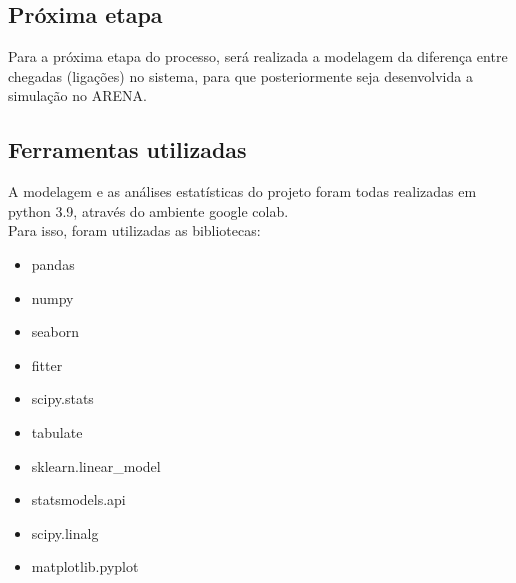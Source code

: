\subsection{Próxima etapa}
Para a próxima etapa do processo, será realizada a modelagem da diferença entre chegadas (ligações) no sistema, para que posteriormente seja desenvolvida a simulação no ARENA.

\subsection{Ferramentas utilizadas}
A modelagem e as análises estatísticas do projeto foram todas realizadas em python 3.9, através do ambiente google colab.\\
Para isso, foram utilizadas as bibliotecas:
\begin{itemize}
    \item pandas
    \item numpy
    \item seaborn
    \item fitter
    \item scipy.stats
    \item tabulate
    \item sklearn.linear\_model
    \item statsmodels.api
    \item scipy.linalg
    \item matplotlib.pyplot
    \end{itemize}